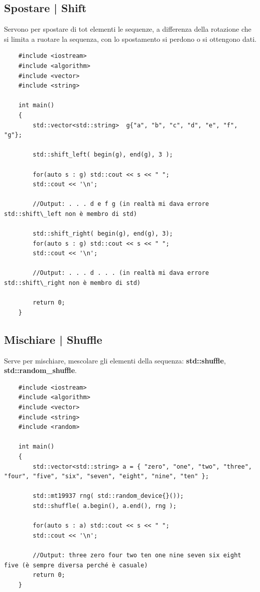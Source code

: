 \subsection{Spostare | Shift}

\textsf{\small Servono per spostare di tot elementi le sequenze, a differenza della rotazione che si limita a ruotare la sequenza, con lo spostamento si perdono o si ottengono dati.} \\

\begin{lstlisting}
	#include <iostream>
	#include <algorithm>
	#include <vector>
	#include <string>
	
	int main()
	{
		std::vector<std::string>  g{"a", "b", "c", "d", "e", "f", "g"};
		
		std::shift_left( begin(g), end(g), 3 );
		
		for(auto s : g) std::cout << s << " ";
		std::cout << '\n';
		
		//Output: . . . d e f g (in realtà mi dava errore std::shift\_left non è membro di std)
		
		std::shift_right( begin(g), end(g), 3);
		for(auto s : g) std::cout << s << " ";
		std::cout << '\n';
		
		//Output: . . . d . . . (in realtà mi dava errore std::shift\_right non è membro di std)
		
		return 0;
	}
\end{lstlisting}

\subsection{Mischiare | Shuffle}

\textsf{\small Serve per mischiare, mescolare gli elementi della sequenza: \textbf{std::shuffle}, \textbf{std::random\_shuffle}.} \\

\begin{lstlisting}
	#include <iostream>
	#include <algorithm>
	#include <vector>
	#include <string>
	#include <random>
	
	int main()
	{
		std::vector<std::string> a = { "zero", "one", "two", "three", "four", "five", "six", "seven", "eight", "nine", "ten" };
		
		std::mt19937 rng( std::random_device{}());
		std::shuffle( a.begin(), a.end(), rng );
		
		for(auto s : a) std::cout << s << " ";
		std::cout << '\n';
		
		//Output: three zero four two ten one nine seven six eight five (è sempre diversa perché è casuale)
		return 0;
	}
\end{lstlisting}

